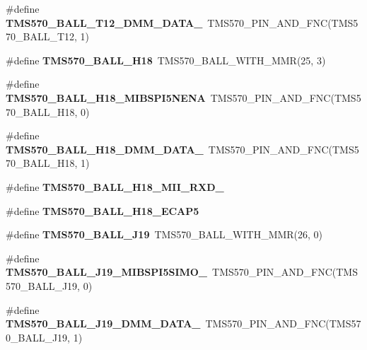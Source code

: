 \begin{DoxyCompactItemize}
\#define {\bfseries T\+M\+S570\+\_\+\+B\+A\+L\+L\+\_\+\+T12\+\_\+\+D\+M\+M\+\_\+\+D\+A\+T\+A\+\_}~T\+M\+S570\+\_\+\+P\+I\+N\+\_\+\+A\+N\+D\+\_\+\+F\+NC(T\+M\+S570\+\_\+\+B\+A\+L\+L\+\_\+\+T12, 1)
\item 
\mbox{\label{tms570lc4357-pins_8h_afca49763384a7130455119b9ddf5d314}} 
\#define {\bfseries T\+M\+S570\+\_\+\+B\+A\+L\+L\+\_\+\+H18}~T\+M\+S570\+\_\+\+B\+A\+L\+L\+\_\+\+W\+I\+T\+H\+\_\+\+M\+MR(25, 3)
\item 
\mbox{\label{tms570lc4357-pins_8h_a6817aca8e6fdd397f560de1c96c9ebce}} 
\#define {\bfseries T\+M\+S570\+\_\+\+B\+A\+L\+L\+\_\+\+H18\+\_\+\+M\+I\+B\+S\+P\+I5\+N\+E\+NA}~T\+M\+S570\+\_\+\+P\+I\+N\+\_\+\+A\+N\+D\+\_\+\+F\+NC(T\+M\+S570\+\_\+\+B\+A\+L\+L\+\_\+\+H18, 0)
\item 
\mbox{\label{tms570lc4357-pins_8h_ab298f6941430d55a7702604d981b6839}} 
\#define {\bfseries T\+M\+S570\+\_\+\+B\+A\+L\+L\+\_\+\+H18\+\_\+\+D\+M\+M\+\_\+\+D\+A\+T\+A\+\_}~T\+M\+S570\+\_\+\+P\+I\+N\+\_\+\+A\+N\+D\+\_\+\+F\+NC(T\+M\+S570\+\_\+\+B\+A\+L\+L\+\_\+\+H18, 1)
\item 
\#define {\bfseries T\+M\+S570\+\_\+\+B\+A\+L\+L\+\_\+\+H18\+\_\+\+M\+I\+I\+\_\+\+R\+X\+D\+\_}
\item 
\#define {\bfseries T\+M\+S570\+\_\+\+B\+A\+L\+L\+\_\+\+H18\+\_\+\+E\+C\+A\+P5}
\item 
\mbox{\label{tms570lc4357-pins_8h_a3f2431d143956eb49d77ca9b8ff714ad}} 
\#define {\bfseries T\+M\+S570\+\_\+\+B\+A\+L\+L\+\_\+\+J19}~T\+M\+S570\+\_\+\+B\+A\+L\+L\+\_\+\+W\+I\+T\+H\+\_\+\+M\+MR(26, 0)
\item 
\mbox{\label{tms570lc4357-pins_8h_a81a0f2eaf3f49ffb3cf4982b5b83c2a3}} 
\#define {\bfseries T\+M\+S570\+\_\+\+B\+A\+L\+L\+\_\+\+J19\+\_\+\+M\+I\+B\+S\+P\+I5\+S\+I\+M\+O\+\_}~T\+M\+S570\+\_\+\+P\+I\+N\+\_\+\+A\+N\+D\+\_\+\+F\+NC(T\+M\+S570\+\_\+\+B\+A\+L\+L\+\_\+\+J19, 0)
\item 
\mbox{\label{tms570lc4357-pins_8h_a42f40a82ae3f11da8a581b80577bf28a}} 
\#define {\bfseries T\+M\+S570\+\_\+\+B\+A\+L\+L\+\_\+\+J19\+\_\+\+D\+M\+M\+\_\+\+D\+A\+T\+A\+\_}~T\+M\+S570\+\_\+\+P\+I\+N\+\_\+\+A\+N\+D\+\_\+\+F\+NC(T\+M\+S570\+\_\+\+B\+A\+L\+L\+\_\+\+J19, 1)

\end{DoxyCompactItemize}
